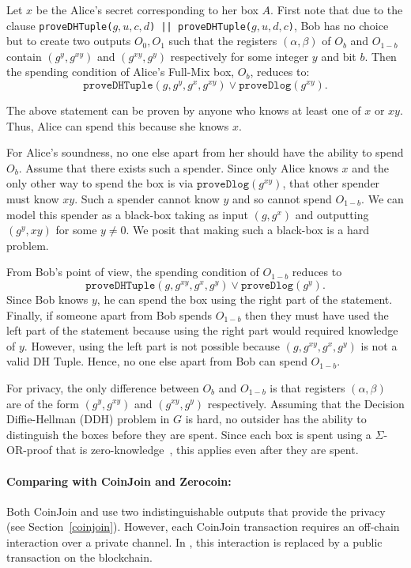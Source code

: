 \documentclass[runningheads]{llncs}
\newcommand{\zerocoin}{Zerocoin\xspace}
\begin{document}
Let $x$ be the Alice's secret corresponding to her box $A$. First note that due to the clause 
\texttt{proveDHTuple($g, u, c, d$) || proveDHTuple($g, u, d, c$)}, Bob has no choice but to create two outputs $O_0, O_1$ such that the registers $(\alpha, \beta)$ of $O_b$ and $O_{1-b}$ contain $(g^y, g^{xy})$ and $(g^{xy}, g^y)$ respectively for some integer $y$ and bit $b$. Then the spending condition of Alice's Full-Mix box, $O_b$, reduces to:
$$\texttt{proveDHTuple}(g, g^{y}, g^x, g^{xy}) \lor \texttt{proveDlog}(g^{xy}).$$ 

The above statement can be proven by anyone who knows at least one of $x$ or $xy$. 
Thus, Alice can spend this because she knows $x$. 

For Alice's soundness, no one else apart from her should have the ability to spend $O_b$. Assume that there exists such a spender. Since only Alice knows $x$ and the only other way to spend the box is via $\texttt{proveDlog}(g^{xy})$, that other spender must know $xy$. Such a spender cannot know $y$ and so cannot spend $O_{1-b}$. We can model this spender as a black-box taking as input $(g, g^x)$ and outputting $(g^y, xy)$ for some $y\neq 0$. We posit that making such a black-box is a hard problem.

From Bob's point of view, the spending condition of $O_{1-b}$ reduces to 
$$\texttt{proveDHTuple}(g, g^{xy}, g^x, g^{y}) \lor \texttt{proveDlog}(g^{y}).$$
Since Bob knows $y$, he can spend the box using the right part of the statement. Finally, if someone apart from Bob spends $O_{1-b}$ then they must have used the left part of the statement because using the right part would required knowledge of $y$. However, using the left part is not possible because $(g, g^{xy}, g^x, g^{y})$ is not a valid DH Tuple. Hence, no one else apart from Bob can spend $O_{1-b}$.

For privacy, the only difference between $O_b$ and $O_{1-b}$ is that registers $(\alpha,\beta)$ are of the form $(g^y, g^{xy})$ and $(g^{xy}, g^y)$ respectively. Assuming that the Decision Diffie-Hellman (DDH) problem in $G$ is hard, no outsider has the ability to distinguish the boxes before they are spent. Since each box is spent using a $\Sigma$-OR-proof that is zero-knowledge~\cite{Dam10}, this applies even after they are spent. 

\paragraph{Comparing with CoinJoin and \zerocoin:} Both CoinJoin and \algname use two indistinguishable outputs that provide the privacy (see Section~\ref{coinjoin}). However, each CoinJoin transaction requires an off-chain interaction over a private channel. In \algname, this interaction is replaced by a public transaction on the blockchain. 
\end{document}
